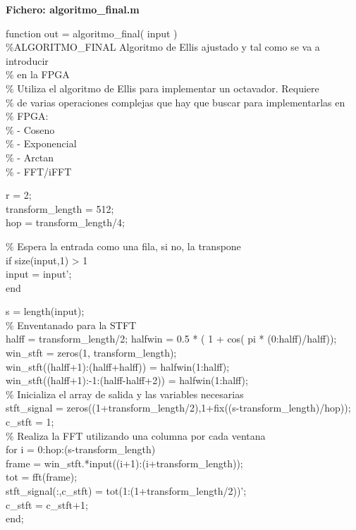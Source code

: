 \noindent \textbf{Fichero: algoritmo\_final.m}

\noindent function out = algoritmo\_final( input )\\

\noindent \%ALGORITMO\_FINAL Algoritmo de Ellis ajustado y tal como se va a introducir\\
\%     en la FPGA\\
\%   Utiliza el algoritmo de Ellis para implementar un octavador. Requiere\\
\%   de varias operaciones complejas que hay que buscar para implementarlas en\\
\%   FPGA:\\
\%     - Coseno\\
\%     - Exponencial\\
\%     - Arctan\\
\%     - FFT/iFFT

\noindent r = 2;\\
transform\_length = 512;\\
hop = transform\_length/4;

\noindent \% Espera la entrada como una fila, si no, la transpone\\
if size(input,1) > 1\\
  input = input';\\
end

\noindent s = length(input);\\
\% Enventanado para la STFT \\
halff = transform\_length/2;   %
halfwin = 0.5 * ( 1 + cos( pi * (0:halff)/halff));\\
win\_stft = zeros(1, transform\_length);\\
win\_stft((halff+1):(halff+halff)) = halfwin(1:halff);\\
win\_stft((halff+1):-1:(halff-halff+2)) = halfwin(1:halff);\\

\noindent \% Inicializa el array de salida y las variables necesarias\\
stft\_signal = zeros((1+transform\_length/2),1+fix((s-transform\_length)/hop));\\
c\_stft = 1;\\
\% Realiza la FFT utilizando una columna por cada ventana\\
for i = 0:hop:(s-transform\_length)\\
  frame = win\_stft.*input((i+1):(i+transform\_length));\\
  tot = fft(frame);\\
  stft\_signal(:,c\_stft) = tot(1:(1+transform\_length/2))';\\
  c\_stft = c\_stft+1;\\
end;\\

